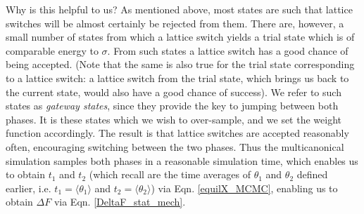 \documentclass{report}
\begin{document}
Why is this helpful to us? As mentioned above, most states are such that lattice switches will be almost certainly be rejected from them. There 
are, however, a small number of states from which a lattice switch yields a trial state which is of comparable energy to $\sigma$. From such 
states a lattice switch has a good chance of being accepted. (Note that the same is also true for the trial state corresponding to a lattice switch:
a lattice switch from the trial state, which brings us back to the current state, would also have a good chance of success). We refer to 
such states as \emph{gateway states}, since they provide the key to jumping between both phases. It is these states which we wish to over-sample,
and we set the weight function accordingly. The result is that lattice switches are accepted reasonably often, encouraging switching between the 
two phases. Thus the multicanonical simulation samples both phases in a reasonable simulation time, which enables us to obtain 
$t_1$ and $t_2$ (which recall are the time averages of $\theta_1$ and $\theta_2$ defined earlier, i.e. $t_1=\langle\theta_1\rangle$ and 
$t_2=\langle\theta_2\rangle$) via Eqn. \eqref{equilX_MCMC}, enabling us to obtain $\Delta F$ via Eqn. \eqref{DeltaF_stat_mech}.
\end{document}
